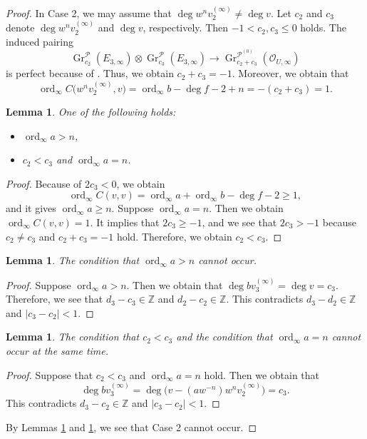 \documentclass[10pt,a4paper]{amsart}
\numberwithin{equation}{section}
\newtheorem{Lemma}[Theorem]{Lemma}
\newcommand{\Z}{\mathbb{Z}}
\newcommand{\ord}{\operatorname{ord}}
\newcommand{\strsheaf}{\mathcal{O}}
\newcommand{\gr}{\operatorname{\mathrm{Gr}}}
\begin{document}
\begin{proof}
In Case 2, we may assume that $\deg{w^{n}v^{(\infty)}_2} \neq \deg{v}$. Let $c_2$ and $c_3$ denote $\deg{w^{n}v^{(\infty)}_2}$ and $\deg{v}$, respectively. Then $-1<c_2,c_3\leq 0$ holds. The induced pairing
 \begin{equation*}
 \gr^{\mathcal{P}}_{c_2} (E_{3,\infty})\otimes \gr^{\mathcal{P}}_{c_3} (E_{3,\infty}) \to \gr^{\mathcal{P}^{(0)}}_{c_2+c_3} (\strsheaf_{U,\infty})
 \end{equation*}
 is perfect because of . Thus, we obtain $c_2 + c_3= -1$. Moreover, we obtain that
 \begin{equation*}
 \ord_{\infty}C\big(w^n v^{(\infty)}_2,v\big) = \ord_{\infty} b - \deg{f}-2 + n = -(c_2+c_3) = 1.
 \end{equation*}
 \begin{Lemma}
 One of the following holds:
 \begin{itemize}\itemsep=0pt
 \item $\ord_{\infty} a > n$,
 \item $c_2 < c_3$ and $\ord_{\infty} a=n$.
 \end{itemize}
 \end{Lemma}
 \begin{proof}
 Because of $2c_3 < 0$, we obtain
 \begin{equation*}
 \ord_{\infty}C(v,v) = \ord_{\infty}a+\ord_{\infty}b-\deg{f}-2 \geq 1,
 \end{equation*}
 and it gives $\ord_{\infty} a\geq n$. Suppose $\ord_{\infty}a=n$. Then we obtain $\ord_{\infty}C(v,v)=1$. It implies that $2c_3\geq-1$, and we see that $2c_3>-1$ because $c_2\neq c_3$ and $c_2+c_3=-1$ hold. Therefore, we obtain $c_2 < c_3$.
 \end{proof}

 \begin{Lemma}\label{cannot_occur1}
 The condition that $\ord_{\infty} a > n$ cannot occur.
 \end{Lemma}
 \begin{proof}
 Suppose $\ord_{\infty} a > n$. Then we obtain that $\deg{bv^{(\infty)}_3} = \deg{v} = c_3$. Therefore, we see that $d_3-c_3\in \Z$ and $d_2-c_2\in \Z$. This contradicts $d_3-d_2\in\Z$ and $|c_3-c_2|<1$.
 \end{proof}

 \begin{Lemma}\label{cannot_occur2}
 The condition that $c_2 < c_3$ and the condition that $\ord_{\infty} a=n$ cannot occur at the same time.
 \end{Lemma}
 \begin{proof}
 Suppose that $c_2 < c_3$ and $\ord_{\infty} a=n$ hold. Then we obtain that
 \[
 \deg{bv^{(\infty)}_3} = \deg{\big(v-(aw^{-n})w^n v^{(\infty)}_2\big)} = c_3.
 \]
 This contradicts $d_3-c_2\in \Z$ and $|c_3-c_2|<1$.
 \end{proof}
 By Lemmas \ref{cannot_occur1} and \ref{cannot_occur2}, we see that Case 2 cannot occur.
\end{proof}
\end{document}
